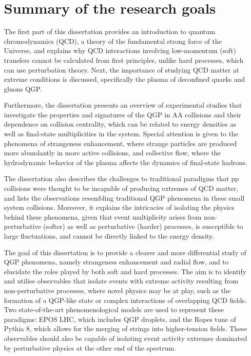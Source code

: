 \section{Summary of the research goals}

The first part of this dissertation provides an introduction to quantum chromodynamics (QCD), a theory of the fundamental strong force of the Universe, and explains why QCD interactions involving low-momentum (soft) transfers cannot be calculated from first principles, unlike hard processes, which can use perturbation theory. Next, the importance of studying QCD matter at extreme conditions is discussed, specifically the plasma of deconfined quarks and gluons QGP. 

Furthermore, the dissertation presents an overview of experimental studies that investigate the properties and signatures of the QGP in AA collisions and their dependence on collision centrality, which can be related to energy densities as well as final-state multiplicities in the system. Special attention is given to the phenomena of strangeness enhancement, where strange particles are produced more abundantly in more active collisions, and collective flow, where the hydrodynamic behavior of the plasma affects the dynamics of final-state hadrons.

The dissertation also describes the challenges to traditional paradigms that pp collisions were thought to be incapable of producing extremes of QCD matter, and lists the observations resembling traditional QGP phenomena in these small system collisions. Moreover, it explains the intricacies of isolating the physics behind these phenomena, given that event multiplicity arises from non-perturbative (softer) as well as perturbative (harder) processes, is susceptible to large fluctuations, and cannot be directly linked to the energy density.

The goal of this dissertation is to provide a clearer and more differential study of QGP phenomena, namely strangeness enhancement and radial flow, and to elucidate the roles played by both soft and hard processes. The aim is to identify and utilise observables that isolate events with extreme activity resulting from non-perturbative processes, where novel physics may be at play, such as the formation of a QGP-like state or complex interactions of overlapping QCD fields. Two state-of-the-art phenomenological models are used to represent these paradigms: EPOS LHC, which includes QGP droplets, and the Ropes tune of Pythia 8, which allows for the merging of strings into higher-tension fields. These observables should also be capable of isolating event activity extremes dominated by perturbative physics at the other end of the spectrum.

